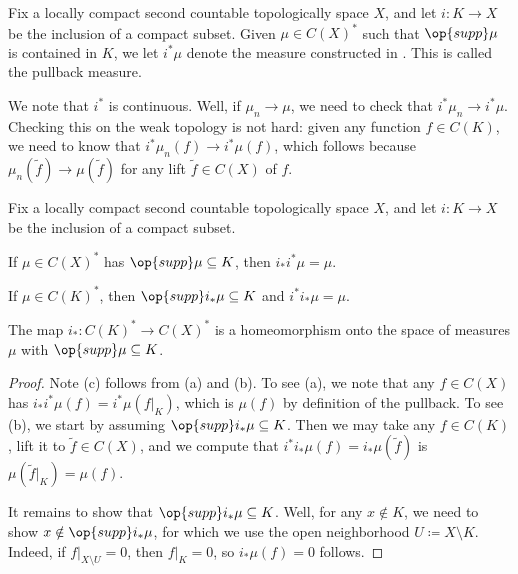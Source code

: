 \documentclass[../notes.tex]{subfiles}
\begin{document}
\begin{notation}
	Fix a locally compact second countable topologically space $X$, and let $i\colon K\to X$ be the inclusion of a compact subset. Given $\mu\in C(X)^*$ such that $\op{supp}\mu$ is contained in $K$, we let $i^*\mu$ denote the measure constructed in . This is called the pullback measure.
\end{notation}
\begin{remark} \label{rem:pullback-cont}
	We note that $i^*$ is continuous. Well, if $\mu_n\to\mu$, we need to check that $i^*\mu_n\to i^*\mu$. Checking this on the weak topology is not hard: given any function $f\in C(K)$, we need to know that $i^*\mu_n(f)\to i^*\mu(f)$, which follows because $\mu_n(\widetilde f)\to\mu(\widetilde f)$ for any lift $\widetilde f\in C(X)$ of $f$.
\end{remark}
\begin{lemma} \label{lem:pull-push}
	Fix a locally compact second countable topologically space $X$, and let $i\colon K\to X$ be the inclusion of a compact subset.
	\begin{listalph}
		\item If $\mu\in C(X)^*$ has $\op{supp}\mu\subseteq K$, then $i_*i^*\mu=\mu$.
		\item If $\mu\in C(K)^*$, then $\op{supp}i_*\mu\subseteq K$ and $i^*i_*\mu=\mu$.
		\item The map $i_*\colon C(K)^*\to C(X)^*$ is a homeomorphism onto the space of measures $\mu$ with $\op{supp}\mu\subseteq K$.
	\end{listalph}
\end{lemma}
\begin{proof}
	Note (c) follows from (a) and (b). To see (a), we note that any $f\in C(X)$ has $i_*i^*\mu(f)=i^*\mu(f|_K)$, which is $\mu(f)$ by definition of the pullback. To see (b), we start by assuming $\op{supp}i_*\mu\subseteq K$. Then we may take any $f\in C(K)$, lift it to $\widetilde f\in C(X)$, and we compute that $i^*i_*\mu(f)=i_*\mu(\widetilde f)$ is $\mu(\widetilde f|_K)=\mu(f)$.

	It remains to show that $\op{supp}i_*\mu\subseteq K$. Well, for any $x\notin K$, we need to show $x\notin\op{supp}i_*\mu$, for which we use the open neighborhood $U\coloneqq X\setminus K$. Indeed, if $f|_{X\setminus U}=0$, then $f|_K=0$, so $i_*\mu(f)=0$ follows.
\end{proof}
\end{document}
